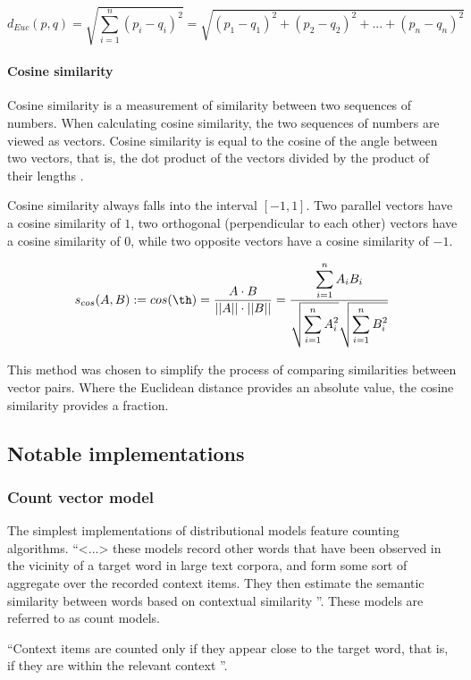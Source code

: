 \documentclass[14pt, a4paper]{extreport}
\begin{document}
\medskip
\[d_{Euc}(p, q) = \sqrt{\displaystyle\sum_{i=1}^{n} (p_i - q_i)^2} = \sqrt{(p_1 - q_1)^2 + (p_2 - q_2)^2 + ... + (p_n - q_n)^2}\]

\paragraph{Cosine similarity}

Cosine similarity is a measurement of similarity between two sequences of numbers. When calculating cosine similarity, the two sequences of numbers are viewed as vectors. Cosine similarity is equal to the cosine of the angle between two vectors, that is, the dot product of the vectors divided by the product of their lengths \parencite{oduntan}.

Cosine similarity always falls into the interval \([-1, 1]\). Two parallel vectors have a cosine similarity of \(1\), two orthogonal (perpendicular to each other) vectors have a cosine similarity of \(0\), while two opposite vectors have a cosine similarity of \(-1\).

\medskip
\[s_{cos}(A, B) := cos(\th) = \frac {A \cdot B}{||A|| \cdot ||B||} = \frac {\displaystyle\sum_{i=1}^{n} A_i B_i}{\sqrt{\displaystyle\sum_{i=1}^{n} A_i^2} \sqrt{\displaystyle\sum_{i=1}^{n} B_i^2}}\]
\medskip

This method was chosen to simplify the process of comparing similarities between vector pairs. Where the Euclidean distance provides an absolute value, the cosine similarity provides a fraction.
    \subsection{Notable implementations}
      \subsubsection{Count vector model}
The simplest implementations of distributional models feature counting algorithms. ``<...> these models record other words that have been observed in the vicinity of a target word in large text corpora, and form some sort of aggregate over the recorded context items. They then estimate the semantic similarity between words based on contextual similarity \parencite{erkkatrin2}''. These models are referred to as count models.

``Context items are counted only if they appear close to the target word, that is, if they are within the relevant context \parencite{erkkatrin2}''.
\end{document}

